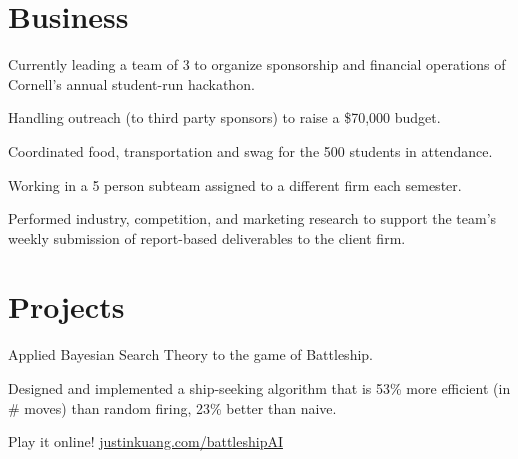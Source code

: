 \documentclass[]{deedy-resume-openfont}
\begin{document}
\begin{minipage}[t]{0.66\textwidth}
\section{Business}

\begin{tightemize}
\item Currently leading a team of 3 to organize sponsorship and financial operations of Cornell's annual student-run hackathon.
\item Handling outreach (to third party sponsors) to raise a \$70,000 budget.
\item Coordinated food, transportation and swag for the 500 students in attendance.
\end{tightemize}
\sectionsep

\begin{tightemize}
\item Working in a 5 person subteam assigned to a different firm each semester.
\item Performed industry, competition, and marketing research to support the team's weekly submission of report-based deliverables to the client firm.
\end{tightemize}
\sectionsep


\section{Projects}

\begin{tightemize}
\item Applied Bayesian Search Theory to the game of Battleship. 
\item Designed and implemented a ship-seeking algorithm that is 53\% more efficient (in \# moves) than random firing, 23\% better than naive.
\item Play it online! \url{justinkuang.com/battleshipAI}
\end{tightemize}
\sectionsep





\end{minipage}
\end{document}
